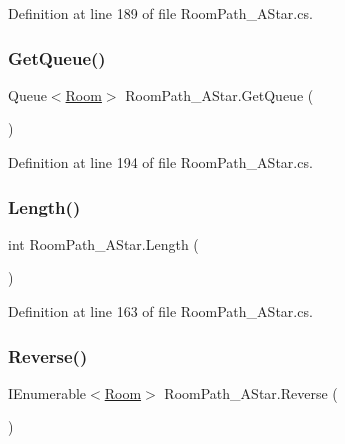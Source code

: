 Definition at line 189 of file Room\+Path\+\_\+\+A\+Star.\+cs.

\mbox{\label{class_room_path___a_star_a45425c3fec23a8687df1d0272f6117e6}} 
\subsubsection{\texorpdfstring{Get\+Queue()}{GetQueue()}}
{\footnotesize\ttfamily Queue$<$\hyperlink{class_project_porcupine_1_1_rooms_1_1_room}{Room}$>$ Room\+Path\+\_\+\+A\+Star.\+Get\+Queue (\begin{DoxyParamCaption}{ }\end{DoxyParamCaption})}



Definition at line 194 of file Room\+Path\+\_\+\+A\+Star.\+cs.

\mbox{\label{class_room_path___a_star_a51c04c59c6facda1cc782e2eadb9f980}} 
\subsubsection{\texorpdfstring{Length()}{Length()}}
{\footnotesize\ttfamily int Room\+Path\+\_\+\+A\+Star.\+Length (\begin{DoxyParamCaption}{ }\end{DoxyParamCaption})}



Definition at line 163 of file Room\+Path\+\_\+\+A\+Star.\+cs.

\mbox{\label{class_room_path___a_star_ab8816fde9809dd35893cbea92158ce8d}} 
\subsubsection{\texorpdfstring{Reverse()}{Reverse()}}
{\footnotesize\ttfamily I\+Enumerable$<$\hyperlink{class_project_porcupine_1_1_rooms_1_1_room}{Room}$>$ Room\+Path\+\_\+\+A\+Star.\+Reverse (\begin{DoxyParamCaption}{ }\end{DoxyParamCaption})}



